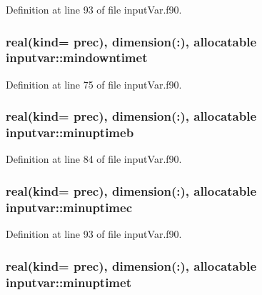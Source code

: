 Definition at line 93 of file input\-Var.\-f90.

\hypertarget{classinputvar_aca351a4427897a65d991d46243fadc34}{
\subsubsection[{mindowntimet}]{\setlength{\rightskip}{0pt plus 5cm}real(kind= prec), dimension(\-:), allocatable inputvar\-::mindowntimet}}\label{classinputvar_aca351a4427897a65d991d46243fadc34}


Definition at line 75 of file input\-Var.\-f90.

\hypertarget{classinputvar_a699644b9b98282661cd55dc10d96dbcb}{
\subsubsection[{minuptimeb}]{\setlength{\rightskip}{0pt plus 5cm}real(kind= prec), dimension(\-:), allocatable inputvar\-::minuptimeb}}\label{classinputvar_a699644b9b98282661cd55dc10d96dbcb}


Definition at line 84 of file input\-Var.\-f90.

\hypertarget{classinputvar_a1c2a4cc32567b94cb7a884d3731bb5f4}{
\subsubsection[{minuptimec}]{\setlength{\rightskip}{0pt plus 5cm}real(kind= prec), dimension(\-:), allocatable inputvar\-::minuptimec}}\label{classinputvar_a1c2a4cc32567b94cb7a884d3731bb5f4}


Definition at line 93 of file input\-Var.\-f90.

\hypertarget{classinputvar_a90d0b599ed6468fc322cf2fbd6b4ec95}{
\subsubsection[{minuptimet}]{\setlength{\rightskip}{0pt plus 5cm}real(kind= prec), dimension(\-:), allocatable inputvar\-::minuptimet}}\label{classinputvar_a90d0b599ed6468fc322cf2fbd6b4ec95}


